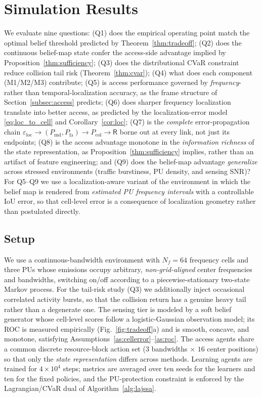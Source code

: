 \documentclass[journal]{IEEEtran}
\newcommand{\Nf}{N_f}                      %
\newcommand{\Pmd}{P_{\mathrm{md}}}         %
\newcommand{\Pfa}{P_{\mathrm{fa}}}         %
\newcommand{\Pcol}{P_{\mathrm{col}}}       %
\newcommand{\thru}{\mathsf{R}}             %
\newcommand{\eloc}{\varepsilon_{\mathrm{loc}}}
\begin{document}
\section{Simulation Results}
\label{sec:simulation}

We evaluate nine questions: (Q1) does the empirical operating point match the
optimal belief threshold predicted by Theorem~\ref{thm:tradeoff}; (Q2) does
the continuous belief-map state confer the access-side advantage implied by
Proposition~\ref{thm:sufficiency}; (Q3) does the distributional CVaR
constraint reduce collision tail risk (Theorem~\ref{thm:cvar}); (Q4) what does
each component (M1/M2/M3) contribute; (Q5) is access performance governed by
\emph{frequency}- rather than temporal-localization accuracy, as the frame
structure of Section~\ref{subsec:access} predicts; (Q6) does sharper
frequency localization translate into better access, as predicted by the
localization-error model \eqref{eq:loc_to_cell} and Corollary~\ref{cor:loc};
(Q7) is the \emph{complete} error-propagation chain
$\eloc\!\to\!(\Pmd,\Pfa)\!\to\!\Pcol\!\to\!\thru$ borne out at every link, not
just its endpoints; (Q8) is the access advantage monotone in the
\emph{information richness} of the state representation, as
Proposition~\ref{thm:sufficiency} implies, rather than an artifact of feature
engineering; and (Q9) does the belief-map advantage \emph{generalize} across
stressed environments (traffic burstiness, PU density, and sensing SNR)?
For Q5--Q9 we use a localization-aware variant of the environment in which the
belief map is rendered from \emph{estimated PU frequency intervals} with a
controllable IoU error, so that cell-level error is a consequence of
localization geometry rather than postulated directly.

\subsection{Setup}
We use a continuous-bandwidth environment with $\Nf=64$ frequency cells and
three PUs whose emissions occupy arbitrary, \emph{non-grid-aligned} center
frequencies and bandwidths, switching on/off according to a
piecewise-stationary two-state Markov process. For the tail-risk study (Q3)
we additionally inject occasional correlated activity bursts, so that the
collision return has a genuine heavy tail rather than a degenerate one. The
sensing tier is modeled by a soft belief generator whose cell-level scores
follow a logistic-Gaussian observation model; its ROC is measured empirically
(Fig.~\ref{fig:tradeoff}a) and is
smooth, concave, and monotone, satisfying
Assumptions~\ref{as:cellerror}--\ref{as:roc}. The access agents share a common
discrete resource-block action set ($3$ bandwidths $\times$ $16$ center
positions) so that only the \emph{state representation} differs across
methods. Learning agents are trained for $4\times10^4$ steps; metrics are
averaged over ten seeds for the learners and ten for the fixed policies, and
the PU-protection constraint is enforced by the Lagrangian/CVaR dual of
Algorithm~\ref{alg:lajssa}.
\end{document}
